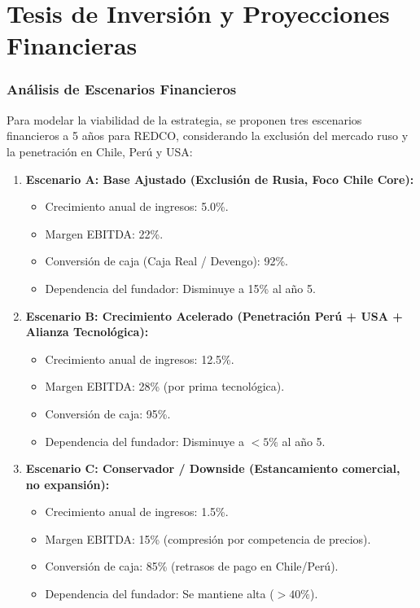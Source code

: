 \chapter{Tesis de Inversión y Proyecciones Financieras}

\subsection{Análisis de Escenarios Financieros}

Para modelar la viabilidad de la estrategia, se proponen tres escenarios financieros a 5 años para REDCO, considerando la exclusión del mercado ruso y la penetración en Chile, Perú y USA:

\begin{enumerate}
    \item \textbf{Escenario A: Base Ajustado (Exclusión de Rusia, Foco Chile Core):}
    \begin{itemize}
        \item Crecimiento anual de ingresos: 5.0\%.
        \item Margen EBITDA: 22\%.
        \item Conversión de caja (Caja Real / Devengo): 92\%.
        \item Dependencia del fundador: Disminuye a 15\% al año 5.
    \end{itemize}

    \item \textbf{Escenario B: Crecimiento Acelerado (Penetración Perú + USA + Alianza Tecnológica):}
    \begin{itemize}
        \item Crecimiento anual de ingresos: 12.5\%.
        \item Margen EBITDA: 28\% (por prima tecnológica).
        \item Conversión de caja: 95\%.
        \item Dependencia del fundador: Disminuye a $<5\%$ al año 5.
    \end{itemize}

    \item \textbf{Escenario C: Conservador / Downside (Estancamiento comercial, no expansión):}
    \begin{itemize}
        \item Crecimiento anual de ingresos: 1.5\%.
        \item Margen EBITDA: 15\% (compresión por competencia de precios).
        \item Conversión de caja: 85\% (retrasos de pago en Chile/Perú).
        \item Dependencia del fundador: Se mantiene alta ($>40\%$).
    \end{itemize}
\end{enumerate}


